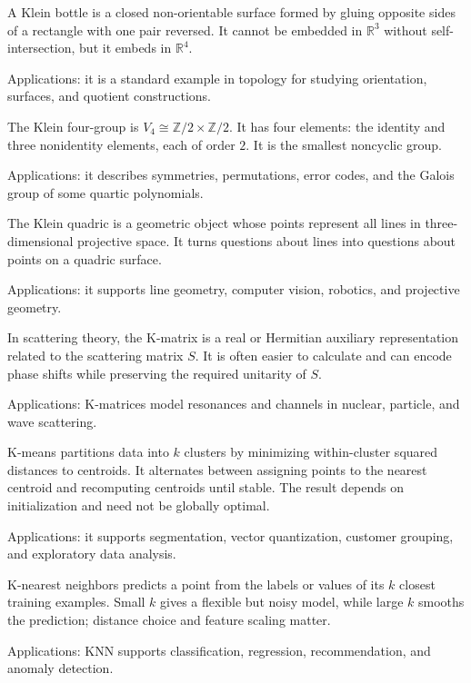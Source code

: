 A Klein bottle is a closed non-orientable surface formed by gluing opposite sides of a rectangle with one pair reversed. It cannot be embedded in $\mathbb R^3$ without self-intersection, but it embeds in $\mathbb R^4$. \par\noindent Applications: it is a standard example in topology for studying orientation, surfaces, and quotient constructions.

The Klein four-group is $V_4\cong\mathbb Z/2\times\mathbb Z/2$. It has four elements: the identity and three nonidentity elements, each of order $2$. It is the smallest noncyclic group. \par\noindent Applications: it describes symmetries, permutations, error codes, and the Galois group of some quartic polynomials.

The Klein quadric is a geometric object whose points represent all lines in three-dimensional projective space. It turns questions about lines into questions about points on a quadric surface. \par\noindent Applications: it supports line geometry, computer vision, robotics, and projective geometry.

In scattering theory, the K-matrix is a real or Hermitian auxiliary representation related to the scattering matrix $S$. It is often easier to calculate and can encode phase shifts while preserving the required unitarity of $S$. \par\noindent Applications: K-matrices model resonances and channels in nuclear, particle, and wave scattering.

K-means partitions data into $k$ clusters by minimizing within-cluster squared distances to centroids. It alternates between assigning points to the nearest centroid and recomputing centroids until stable. The result depends on initialization and need not be globally optimal. \par\noindent Applications: it supports segmentation, vector quantization, customer grouping, and exploratory data analysis.

K-nearest neighbors predicts a point from the labels or values of its $k$ closest training examples. Small $k$ gives a flexible but noisy model, while large $k$ smooths the prediction; distance choice and feature scaling matter. \par\noindent Applications: KNN supports classification, regression, recommendation, and anomaly detection.

